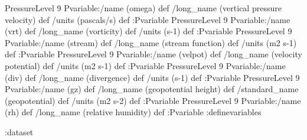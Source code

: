 \begin{ingrid}
PressureLevel 9 Pvariable:/name (omega) def /long_name (vertical pressure velocity)  def /units (pascals/s) def :Pvariable
PressureLevel 9 Pvariable:/name (vrt) def /long_name (vorticity)  def /units (s-1) def :Pvariable
PressureLevel 9 Pvariable:/name (stream) def /long_name (stream function) def /units (m2 s-1) def :Pvariable
PressureLevel 9 Pvariable:/name (velpot) def /long_name (velocity potential) def /units (m2 s-1) def :Pvariable
PressureLevel 9 Pvariable:/name (div) def /long_name (divergence) def /units (s-1) def :Pvariable
PressureLevel 9 Pvariable:/name (gz) def /long_name (geopotential height) def /standard_name (geopotential) def /units (m2 s-2) def :Pvariable
PressureLevel 9 Pvariable:/name (rh) def /long_name (relative humidity) def :Pvariable
:definevariables

:dataset

\end{ingrid}




